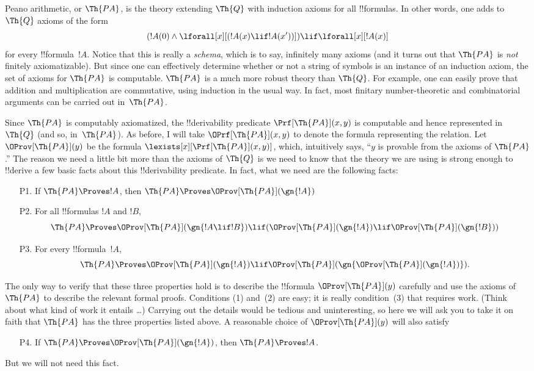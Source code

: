 \documentclass[../../../include/open-logic-section]{subfiles}
\begin{document}


Peano arithmetic, or $\Th{PA}$, is the theory extending $\Th{Q}$ with
induction axioms for all !!{formula}s. In other words, one adds to $\Th{Q}$
axioms of the form
\[
(!A(0) \land \lforall[x][(!A(x) \lif !A(x'))]) \lif \lforall[x][!A(x)]
\]
for every !!{formula}~$!A$. Notice that this is really a {\em schema},
which is to say, infinitely many axioms (and it turns out that
$\Th{PA}$ is {\em not} finitely axiomatizable). But since one can
effectively determine whether or not a string of symbols is an
instance of an induction axiom, the set of axioms for $\Th{PA}$ is
computable. $\Th{PA}$ is a much more robust theory than $\Th{Q}$. For
example, one can easily prove that addition and multiplication are
commutative, using induction in the usual way. In fact, most finitary
number-theoretic and combinatorial arguments can be carried out
in~$\Th{PA}$.

Since $\Th{PA}$ is computably axiomatized, the !!{derivability} predicate
$\Prf[\Th{PA}](x,y)$ is computable and hence represented in~$\Th{Q}$ (and
so, in~$\Th{PA}$). As before, I will take $\OPrf[\Th{PA}](x,y)$ to denote
the formula representing the relation.  Let $\OProv[\Th{PA}](y)$ be the
formula $\lexists[x][\Prf[\Th{PA}](x,y)]$, which, intuitively says, ``$y$ is
provable from the axioms of $\Th{PA}$.''  The reason we need a little
bit more than the axioms of $\Th{Q}$ is we need to know that the
theory we are using is strong enough to !!{derive} a few basic facts about
this !!{derivability} predicate. In fact, what we need are the following
facts:
\begin{enumerate}
\item[P1.] If $\Th{PA} \Proves !A$, then $\Th{PA} \Proves
  \OProv[\Th{PA}](\gn{!A})$
\item[P2.] For all !!{formula}s $!A$ and $!B$,
  \[
  \Th{PA} \Proves \OProv[\Th{PA}](\gn{!A \lif !B}) \lif
  (\OProv[\Th{PA}](\gn{!A}) \lif \OProv[\Th{PA}](\gn{!B}))
  \]
\item[P3.] For every !!{formula}~$!A$,
  \[
  \Th{PA} \Proves \OProv[\Th{PA}](\gn{!A})
  \lif \OProv[\Th{PA}](\gn{\OProv[\Th{PA}](\gn{!A})}).
  \]
\end{enumerate}
The only way to verify that these three properties hold is to describe
the !!{formula} $\OProv[\Th{PA}](y)$ carefully and use the axioms of
$\Th{PA}$ to describe the relevant formal proofs. Conditions (1)
and~(2) are easy; it is really condition~(3) that requires
work. (Think about what kind of work it entails \dots) Carrying out the
details would be tedious and uninteresting, so here we will ask you to
take it on faith that $\Th{PA}$ has the three properties listed
above. A reasonable choice of $\OProv[\Th{PA}](y)$ will also satisfy
\begin{enumerate}
\item[P4.] If $\Th{PA} \Proves \OProv[\Th{PA}](\gn{!A})$, then
  $\Th{PA} \Proves !A$.
\end{enumerate}
But we will not need this fact.
\end{document}
